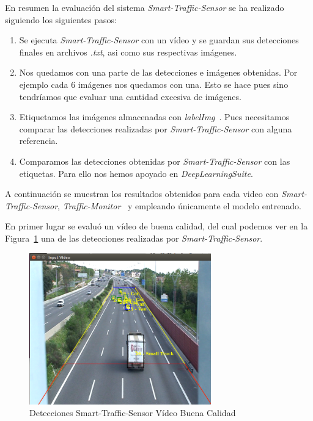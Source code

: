 En resumen la evaluación del sistema \textit{Smart-Traffic-Sensor} se ha realizado siguiendo los siguientes pasos:

\begin{enumerate}
    \item Se ejecuta \textit{Smart-Traffic-Sensor} con un vídeo y se guardan sus detecciones finales en archivos \textit{.txt}, asi como sus respectivas imágenes.
    \item Nos quedamos con una parte de las detecciones e imágenes obtenidas. Por ejemplo cada 6 imágenes nos quedamos con una. Esto se hace pues sino tendríamos que evaluar una cantidad excesiva de imágenes.
    \item Etiquetamos las imágenes almacenadas con \textit{labelImg}~\cite{labelimg}. Pues necesitamos comparar las detecciones realizadas por \textit{Smart-Traffic-Sensor} con alguna referencia.
    \item Comparamos las detecciones obtenidas por \textit{Smart-Traffic-Sensor} con las etiquetas. Para ello nos hemos apoyado en \textit{DeepLearningSuite}.
\end{enumerate}


A continuación se muestran los resultados obtenidos para cada video con \textit{Smart-Traffic-Sensor}, \textit{Traffic-Monitor}~\cite{redo_tesis} y empleando únicamente el modelo entrenado.

En primer lugar se evaluó un vídeo de buena calidad, del cual podemos ver en la Figura~\ref{fig.video_buena_calidad} una de las detecciones realizadas por \textit{Smart-Traffic-Sensor}.

\begin{figure}[H] 
\begin{center}
	\includegraphics[width=0.7\textwidth]{figures/Experimentos/sts_buena.png}
   \caption{Detecciones Smart-Traffic-Sensor Vídeo Buena Calidad}
	\label{fig.video_buena_calidad}
\end{center}
\end{figure}

